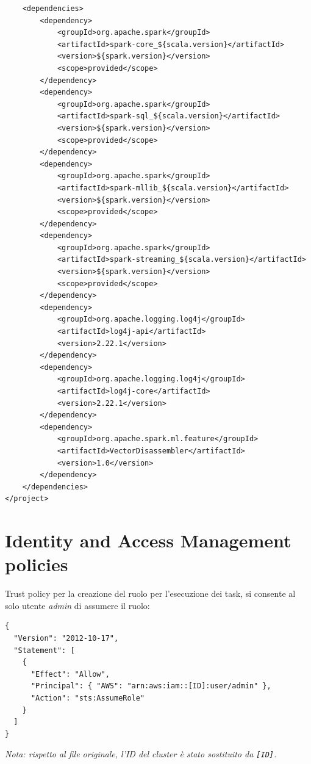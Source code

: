 \documentclass[12pt,a4paper,fleqn,titlepage]{report}
\begin{document}
\begin{lstlisting}
    <dependencies>
        <dependency>
            <groupId>org.apache.spark</groupId>
            <artifactId>spark-core_${scala.version}</artifactId>
            <version>${spark.version}</version>
            <scope>provided</scope>
        </dependency>
        <dependency>
            <groupId>org.apache.spark</groupId>
            <artifactId>spark-sql_${scala.version}</artifactId>
            <version>${spark.version}</version>
            <scope>provided</scope>
        </dependency>
        <dependency>
            <groupId>org.apache.spark</groupId>
            <artifactId>spark-mllib_${scala.version}</artifactId>
            <version>${spark.version}</version>
            <scope>provided</scope>
        </dependency>
        <dependency>
            <groupId>org.apache.spark</groupId>
            <artifactId>spark-streaming_${scala.version}</artifactId>
            <version>${spark.version}</version>
            <scope>provided</scope>
        </dependency>
        <dependency>
            <groupId>org.apache.logging.log4j</groupId>
            <artifactId>log4j-api</artifactId>
            <version>2.22.1</version>
        </dependency>
        <dependency>
            <groupId>org.apache.logging.log4j</groupId>
            <artifactId>log4j-core</artifactId>
            <version>2.22.1</version>
        </dependency>
        <dependency>
            <groupId>org.apache.spark.ml.feature</groupId>
            <artifactId>VectorDisassembler</artifactId>
            <version>1.0</version>
        </dependency>
    </dependencies>
</project>
\end{lstlisting}

\chapter{Identity and Access Management policies}\label{apx:policy}
Trust policy per la creazione del ruolo per l'esecuzione dei task, si consente al solo utente \emph{admin} di assumere il ruolo:
\begin{lstlisting}
{
  "Version": "2012-10-17",
  "Statement": [
    {
      "Effect": "Allow",
      "Principal": { "AWS": "arn:aws:iam::[ID]:user/admin" },
      "Action": "sts:AssumeRole"
    }
  ]
}
\end{lstlisting}
\textit{Nota: rispetto al file originale, l'ID del cluster è stato sostituito da \emph{\lstinline{[ID]}}.}
\end{document}

